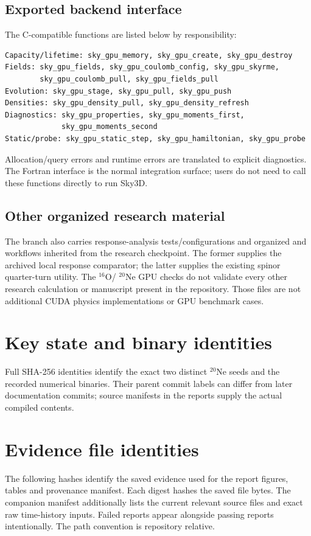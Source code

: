 \documentclass[11pt,a4paper]{article}
\newcommand{\Ne}{\texorpdfstring{\ensuremath{^{20}\mathrm{Ne}}}{20Ne}}
\newcommand{\Ox}{\texorpdfstring{\ensuremath{^{16}\mathrm{O}}}{16O}}
\begin{document}
\subsection{Exported backend interface}
The C-compatible functions are listed below by responsibility:
\begin{lstlisting}
Capacity/lifetime: sky_gpu_memory, sky_gpu_create, sky_gpu_destroy
Fields: sky_gpu_fields, sky_gpu_coulomb_config, sky_gpu_skyrme,
        sky_gpu_coulomb_pull, sky_gpu_fields_pull
Evolution: sky_gpu_stage, sky_gpu_pull, sky_gpu_push
Densities: sky_gpu_density_pull, sky_gpu_density_refresh
Diagnostics: sky_gpu_properties, sky_gpu_moments_first,
             sky_gpu_moments_second
Static/probe: sky_gpu_static_step, sky_gpu_hamiltonian, sky_gpu_probe
\end{lstlisting}
Allocation/query errors and runtime errors are translated to explicit
diagnostics. The Fortran interface is the normal integration surface;
users do not need to call these functions directly to run Sky3D.

\subsection{Other organized research material}
The branch also carries response-analysis tests/configurations and organized
 and
 workflows inherited from the research
checkpoint. The former supplies the archived local response comparator;
the latter supplies the existing spinor quarter-turn utility. The \Ox{}/
\Ne{} GPU checks do not validate every other research calculation or
manuscript present in the repository. Those files are not additional CUDA
physics implementations or GPU benchmark cases.

\section{Key state and binary identities}
\label{app:hashes}
Full SHA-256 identities identify the exact two distinct \Ne{} seeds and
the recorded numerical binaries. Their parent commit labels can differ
from later documentation commits; source manifests in the reports supply
the actual compiled contents.


\section{Evidence file identities}
\label{app:evidence}
The following hashes identify the saved evidence used for the report
figures, tables and provenance manifest. Each digest hashes the saved file bytes. The
companion manifest additionally lists the current relevant source files
and exact raw time-history inputs. Failed reports appear alongside passing
reports intentionally. The path convention is repository relative.
{\small\setlength{\parskip}{3pt}}
\end{document}
